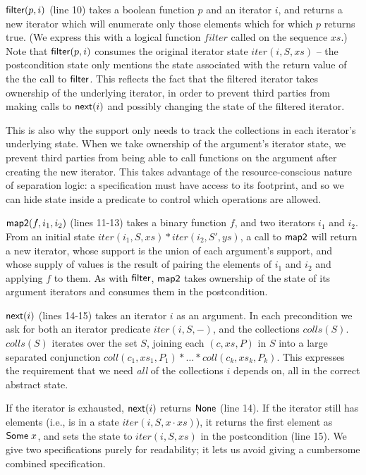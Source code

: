 \documentclass[preprint,natbib]{sigplanconf}
\begin{document}
$\mbox{\textsf{{filter}}}(p, i)$ (line 10) takes a boolean function $p$ and an
iterator $i$, and returns a new iterator which will enumerate only
those elements which for which $p$ returns true. (We express this with
a logical function $filter$ called on the sequence $xs$.) Note that
$\mbox{\textsf{{filter}}}(p, i)$ consumes the original iterator state $iter(i,
S, xs)$ -- the postcondition state only mentions the state associated
with the return value of the the call to $\mbox{\textsf{{filter}}}$. This
reflects the fact that the filtered iterator takes ownership of the
underlying iterator, in order to prevent third parties from making
calls to $\mbox{\textsf{{next}}}(i)$ and possibly changing the state of the
filtered iterator. 

This is also why the support only needs to track the collections in
each iterator's underlying state. When we take ownership of the
argument's iterator state, we prevent third parties from being able to
call functions on the argument after creating the new iterator. This
takes advantage of the resource-conscious nature of separation logic:
a specification must have access to its footprint, and so we can hide
state inside a predicate to control which operations are allowed.  

$\mbox{\textsf{{map2}}}(f, i_1, i_2)$ (lines 11-13) takes a binary function $f$,
and two iterators $i_1$ and $i_2$. From an initial state $iter(i_1, S,
xs) * iter(i_2, S', ys)$, a call to $\mbox{\textsf{{map2}}}$ will return a new
iterator, whose support is the union of each argument's support, and
whose supply of values is the result of pairing the elements of $i_1$
and $i_2$ and applying $f$ to them. As with $\mbox{\textsf{{filter}}}$,
$\mbox{\textsf{{map2}}}$ takes ownership of the state of its argument iterators
and consumes them in the postcondition.

$\mbox{\textsf{{next}}}(i)$ (lines 14-15) takes an iterator $i$ as an argument.
In each precondition we ask for both an iterator predicate $iter(i, S,
-)$, and the collections $colls(S)$. $colls(S)$ iterates over the set
$S$, joining each $(c,xs,P)$ in $S$ into a large separated conjunction
$coll(c_1, xs_1, P_1) * \ldots * coll(c_k, xs_k, P_k)$. This expresses
the requirement that we need \emph{all} of the collections $i$ depends
on, all in the correct abstract state.

If the iterator is exhausted, $\mbox{\textsf{{next}}}(i)$ returns $\mbox{\textsf{{None}}}$
(line 14). If the iterator still has elements (i.e., is in a state
$iter(i, S, x\cdot xs)$), it returns the first element as
$\mbox{\textsf{{Some}}}\;x$, and sets the state to $iter(i, S, xs)$ in the
postcondition (line 15). We give two specifications purely for
readability; it lets us avoid giving a cumbersome combined
specification.
\end{document}
